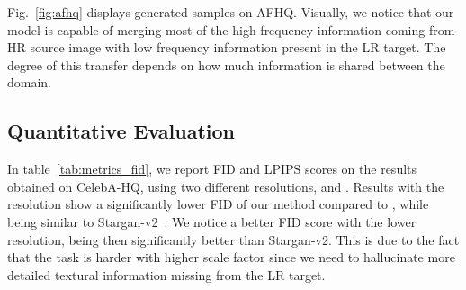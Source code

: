 Fig.~\ref{fig:afhq} displays generated samples on AFHQ. Visually, we notice that our model is capable of merging most of the high frequency information coming from HR source image with low frequency information present in the LR target. The degree of this transfer depends on how much information is shared between the domain.  

\subsection{Quantitative Evaluation}
\label{sec:results}
\begin{table}
\centering
{}
\caption{Quantitative comparison on the CelebA dataset, comparing our method to other reference-guided i2i methods~\cite{starganv,MUNIT, DRIT, msgan}. We follow same procedure as in Stargan-v2~\cite{starganv}, but for our method we sample ten HR images for each LR image.}
\label{tab:metrics_fid}
\vspace{-0.5cm}
\end{table}

In table~\ref{tab:metrics_fid}, we report FID and LPIPS scores on the results obtained on CelebA-HQ, using two different resolutions,  and . Results with the  resolution show a significantly lower FID of our method compared to \cite{MUNIT, DRIT, msgan}, while being similar to Stargan-v2~\cite{starganv}. We notice a better FID score with the lower  resolution, being then significantly better than Stargan-v2. This is due to the fact that the task is harder with higher scale factor since we need to hallucinate more detailed textural information missing from the LR target.

